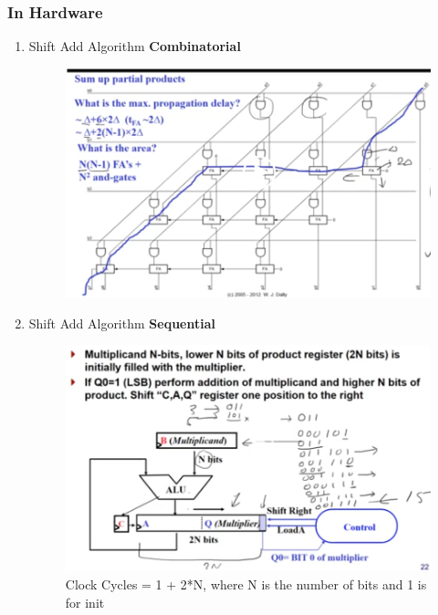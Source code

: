 \documentclass[11pt, a4paper]{article}
\begin{document}
\subsubsection{In Hardware}
\begin{enumerate}
    \item Shift Add Algorithm \textbf{Combinatorial}
    \begin{figure}[H]
        \centering
        \includegraphics[width = \textwidth]{Module 5/Notes/Pictures/Shift-Add.png}
    \end{figure}
    \item Shift Add Algorithm \textbf{Sequential}
    \begin{figure}[H]
        \centering
        \includegraphics[width = \textwidth]{Module 5/Notes/Pictures/Sequetial Mul.png}
        \caption{Clock Cycles = 1 + 2*N, where N is the number of bits and 1 is for init}
    \end{figure}
\end{enumerate}
\end{document}
